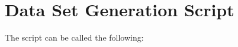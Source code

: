 \chapter{Data Set Generation Script}\label{appendix:generator}


The script can be called the following: 



